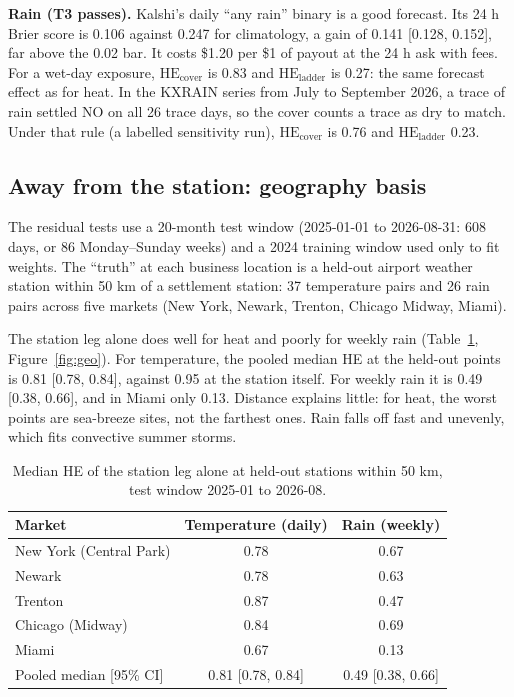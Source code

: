 \documentclass[11pt]{article}
\newcommand{\HEcov}{\mathrm{HE}_{\mathrm{cover}}}
\newcommand{\HElad}{\mathrm{HE}_{\mathrm{ladder}}}
\begin{document}
\textbf{Rain (T3 passes).} Kalshi's daily ``any rain'' binary is a good forecast. Its 24 h Brier score is 0.106 against 0.247 for climatology, a gain of 0.141 [0.128, 0.152], far above the 0.02 bar. It costs \$1.20 per \$1 of payout at the 24 h ask with fees. For a wet-day exposure, $\HEcov$ is 0.83 and $\HElad$ is 0.27: the same forecast effect as for heat. In the KXRAIN series from July to September 2026, a trace of rain settled NO on all 26 trace days, so the cover counts a trace as dry to match. Under that rule (a labelled sensitivity run), $\HEcov$ is 0.76 and $\HElad$ 0.23.

\subsection{Away from the station: geography basis}
\label{sec:geo}

The residual tests use a 20-month test window (2025-01-01 to 2026-08-31: 608 days, or 86 Monday--Sunday weeks) and a 2024 training window used only to fit weights. The ``truth'' at each business location is a held-out airport weather station within 50 km of a settlement station: 37 temperature pairs and 26 rain pairs across five markets (New York, Newark, Trenton, Chicago Midway, Miami).

The station leg alone does well for heat and poorly for weekly rain (Table~\ref{tab:geo}, Figure~\ref{fig:geo}). For temperature, the pooled median HE at the held-out points is 0.81 [0.78, 0.84], against 0.95 at the station itself. For weekly rain it is 0.49 [0.38, 0.66], and in Miami only 0.13. Distance explains little: for heat, the worst points are sea-breeze sites, not the farthest ones. Rain falls off fast and unevenly, which fits convective summer storms.

\begin{table}[ht]
\centering
\small
\caption{Median HE of the station leg alone at held-out stations within 50 km, test window 2025-01 to 2026-08.}
\label{tab:geo}
\begin{tabular}{lcc}
\toprule
Market & Temperature (daily) & Rain (weekly) \\
\midrule
New York (Central Park) & 0.78 & 0.67 \\
Newark & 0.78 & 0.63 \\
Trenton & 0.87 & 0.47 \\
Chicago (Midway) & 0.84 & 0.69 \\
Miami & 0.67 & 0.13 \\
\midrule
Pooled median [95\% CI] & 0.81 [0.78, 0.84] & 0.49 [0.38, 0.66] \\
\bottomrule
\end{tabular}
\end{table}
\end{document}
